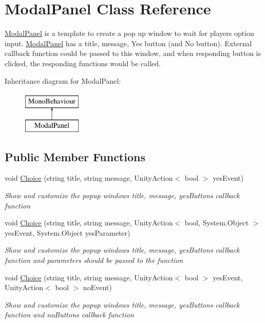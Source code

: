 \hypertarget{class_modal_panel}{}\section{Modal\+Panel Class Reference}
\label{class_modal_panel}


\hyperlink{class_modal_panel}{Modal\+Panel} is a template to create a pop up window to wait for player\textquotesingle{}s option input. \hyperlink{class_modal_panel}{Modal\+Panel} has a title, message, Yes button (and No button). External callback function could be passed to this window, and when responding button is clicked, the responding functions would be called.  


Inheritance diagram for Modal\+Panel\+:\begin{figure}[H]
\begin{center}
\leavevmode
\includegraphics[height=2.000000cm]{class_modal_panel}
\end{center}
\end{figure}
\subsection*{Public Member Functions}
\begin{DoxyCompactItemize}
\item 
void \hyperlink{class_modal_panel_a483b135984734fae019d7eb7756f071c}{Choice} (string title, string message, Unity\+Action$<$ bool $>$ yes\+Event)
\begin{DoxyCompactList}\small\item\em Show and customize the popup window\textquotesingle{}s title, message, yes\+Button\textquotesingle{}s callback function \end{DoxyCompactList}\item 
void \hyperlink{class_modal_panel_ac09d315fc2a04509b943d768dad3b54b}{Choice} (string title, string message, Unity\+Action$<$ bool, System.\+Object $>$ yes\+Event, System.\+Object yes\+Parameter)
\begin{DoxyCompactList}\small\item\em Show and customize the popup window\textquotesingle{}s title, message, yes\+Button\textquotesingle{}s callback function and parameters should be passed to the function \end{DoxyCompactList}\item 
void \hyperlink{class_modal_panel_a8eb51394f84fff6341ee2e96230f09c0}{Choice} (string title, string message, Unity\+Action$<$ bool $>$ yes\+Event, Unity\+Action$<$ bool $>$ no\+Event)
\begin{DoxyCompactList}\small\item\em Show and customize the popup window\textquotesingle{}s title, message, yes\+Button\textquotesingle{}s callback function and no\+Button\textquotesingle{}s callback function \end{DoxyCompactList}\end{DoxyCompactItemize}
